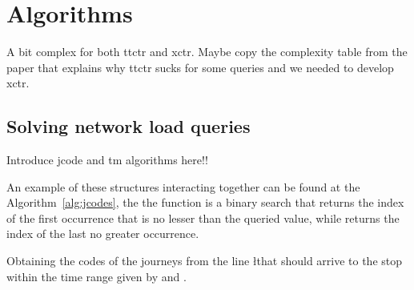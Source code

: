 \section{Algorithms}
\label{sec:newctr:algo}
	A bit complex for both \gls{ttctr} and \gls{xctr}. Maybe copy the complexity table from the paper that explains why \gls{ttctr} sucks for some queries and we needed to develop \gls{xctr}.
	
	\subsection{Solving network load queries}
	Introduce jcode and \gls{tm} algorithms here!!
	
	An example of these structures interacting together can be found at the Algorithm~\ref{alg:jcodes}, the the function  is a binary search that returns the index of the first occurrence that is no lesser than the queried value, while  returns the index of the last no greater occurrence.
    
    \begin{algorithm}[ht]
     
     
     \caption{Obtaining the codes of the journeys from the line \l that should arrive to the stop \s within the time range given by \ta and \tz.}
     \label{alg:jcodes}
    \end{algorithm}
    
